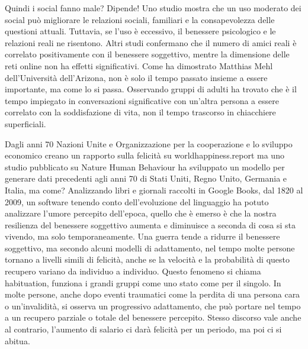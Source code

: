 \documentclass[12pt]{book} %
\begin{document}
\begin{mdframed}[linewidth=1pt]
Quindi i social fanno male? Dipende! Uno studio mostra che un uso moderato dei social può migliorare le relazioni sociali, familiari e la consapevolezza delle questioni attuali. Tuttavia, se l’uso è eccessivo, il benessere psicologico e le relazioni reali ne risentono. Altri studi  confermano che il numero di amici reali è correlato positivamente con il benessere soggettivo, mentre la dimensione delle reti online non ha effetti significativi.
Come ha dimostrato Matthias Mehl dell'Università dell'Arizona, non è solo il tempo passato
insieme a essere importante, ma come lo si passa. Osservando gruppi di adulti ha trovato che è il tempo impiegato in
conversazioni significative con un'altra persona a essere correlato con la soddisfazione di vita, non il tempo
trascorso in chiacchiere superficiali. 
\end{mdframed}

Dagli anni 70 Nazioni Unite e Organizzazione per la cooperazione e lo sviluppo economico creano un rapporto sulla
felicità su worldhappiness.report ma uno studio pubblicato su Nature Human
Behaviour ha sviluppato un modello per generare dati
precedenti agli anni 70 di Stati Uniti, Regno Unito, Germania e Italia, ma come? Analizzando libri e giornali raccolti
in Google Books, dal 1820 al 2009, un software tenendo conto dell'evoluzione del linguaggio ha
potuto analizzare l'umore percepito dell'epoca, quello che è emerso è che la
nostra resilienza del benessere soggettivo aumenta e diminuisce a seconda di cosa si sta vivendo, ma solo
temporaneamente. Una guerra tende a ridurre il benessere soggettivo, ma secondo alcuni modelli di adattamento, nel tempo molte persone tornano a livelli simili di felicità, anche se la velocità e la probabilità di questo recupero variano da individuo a individuo. Questo fenomeno si chiama habituation, funziona i grandi gruppi come uno
stato come per il singolo. In molte persone, anche dopo eventi traumatici come la perdita di una persona cara o un’invalidità, si osserva un progressivo adattamento, che può portare nel tempo a un recupero parziale o totale del benessere percepito. Stesso discorso vale anche
al contrario, l'aumento di salario ci darà felicità per un periodo, ma poi ci si
abitua.
\end{document}
